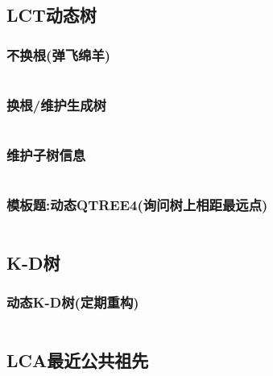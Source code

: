 \documentclass[a4paper, twoside]{article}
\begin{document}
\begin{multicols}{2}
			\subsection{LCT动态树}
				\subsubsection{不换根(弹飞绵羊)}
					\inputminted{cpp}{../src/datastructure/LCT(不换根).cpp}
			
				\subsubsection{换根/维护生成树}
					\inputminted{cpp}{../src/datastructure/LCT(换根).cpp}

				\subsubsection{维护子树信息}
					\inputminted{cpp}{../src/datastructure/LCT维护子树信息.cpp}
					
				\subsubsection[模板题:动态QTREE4]{模板题:动态QTREE4(询问树上相距最远点)}
						\inputminted{cpp}{../src/datastructure/动态QTREE4.cpp}
	
			\subsection{K-D树}

				\subsubsection{动态K-D树(定期重构)}
					\inputminted{cpp}{../src/datastructure/动态KD树.cpp}
	
	
	
			
			\subsection{LCA最近公共祖先}

\end{multicols}
\end{document}
